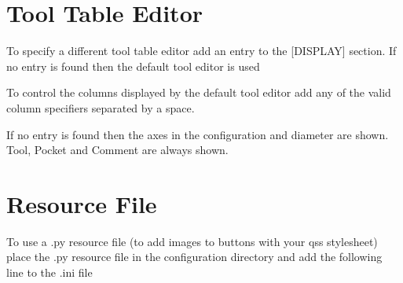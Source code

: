 \documentclass[letterpaper,10pt,english]{sphinxmanual}
\begin{document}
\begin{sphinxVerbatim}[commandchars=\\\{\}]
  
  
  
  
\end{sphinxVerbatim}


\section{Tool Table Editor}
\label{\detokenize{ini:tool-table-editor}}
\sphinxAtStartPar
To specify a different tool table editor add an entry to the {[}DISPLAY{]} section.
If no entry is found then the default tool editor is used

\begin{sphinxVerbatim}[commandchars=\\\{\}]
  
\end{sphinxVerbatim}

\sphinxAtStartPar
To control the columns displayed by the default tool editor add any of the valid
column specifiers separated by a space.

\begin{sphinxVerbatim}[commandchars=\\\{\}]
               
\end{sphinxVerbatim}

\sphinxAtStartPar
If no entry is found then the axes in the configuration and diameter are shown.
Tool, Pocket and Comment are always shown.


\section{Resource File}
\label{\detokenize{ini:resource-file}}
\sphinxAtStartPar
To use a .py resource file (to add images to buttons with your qss stylesheet)
place the .py resource file in the configuration directory and add the
following line to the .ini file
\end{document}
